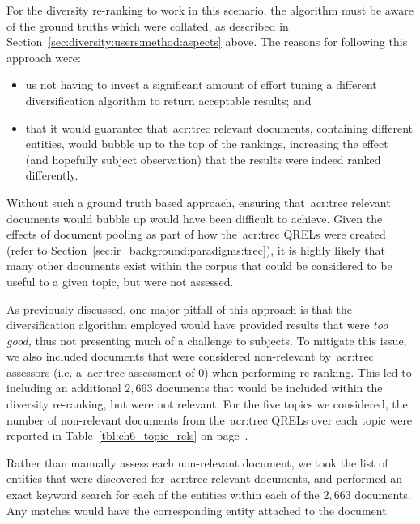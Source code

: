 For the diversity re-ranking to work in this scenario, the algorithm must be aware of the ground truths which were collated, as described in Section~\ref{sec:diversity:users:method:aspects} above. The reasons for following this approach were:

\begin{itemize}
    \item{us not having to invest a significant amount of effort tuning a different diversification algorithm to return acceptable results; and}
    \item{that it would guarantee that~\gls{acr:trec} relevant documents, containing different entities, would bubble up to the top of the rankings, increasing the effect (and hopefully subject observation) that the results were indeed ranked differently.}
\end{itemize}

Without such a ground truth based approach, ensuring that~\gls{acr:trec} relevant documents would bubble up would have been difficult to achieve. Given the effects of document pooling as part of how the~\gls{acr:trec} QRELs were created (refer to Section~\ref{sec:ir_background:paradigms:trec}), it is highly likely that many other documents exist within the corpus that could be considered to be useful to a given topic, but were not assessed.

As previously discussed, one major pitfall of this approach is that the diversification algorithm employed would have provided results that were \emph{too good,} thus not presenting much of a challenge to subjects. To mitigate this issue, we also included documents that were considered non-relevant by~\gls{acr:trec} assessors (i.e. a~\gls{acr:trec} assessment of $0$) when performing re-ranking. This led to including an additional $2,663$ documents that would be included within the diversity re-ranking, but were not relevant. For the five topics we considered, the number of non-relevant documents from the~\gls{acr:trec} QRELs over each topic were reported in Table~\ref{tbl:ch6_topic_rels} on page~\pageref{tbl:ch6_topic_rels}.

Rather than manually assess each non-relevant document, we took the list of entities that were discovered for~\gls{acr:trec} relevant documents, and performed an exact keyword search for each of the entities within each of the $2,663$ documents. Any matches would have the corresponding entity attached to the document.

